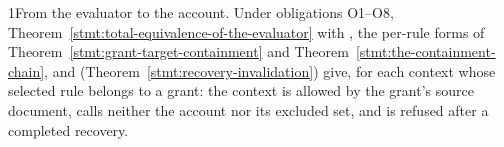 \begin{perchproposition}{1}{From the evaluator to the account.}\label{stmt:from-the-evaluator-to-the-account}
Under obligations O1--O8, Theorem~\ref{stmt:total-equivalence-of-the-evaluator} with , the per-rule forms of Theorem~\ref{stmt:grant-target-containment} and Theorem~\ref{stmt:the-containment-chain}, and  (Theorem~\ref{stmt:recovery-invalidation}) give, for each context whose selected rule belongs to a grant: the context is allowed by the grant's source document, calls neither the account nor its excluded set, and is refused after a completed recovery.
\end{perchproposition}
